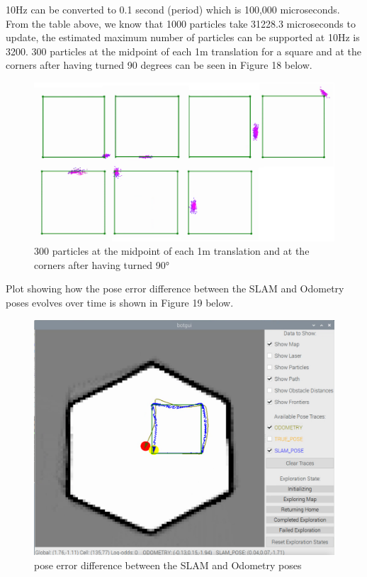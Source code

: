 \documentclass[journal]{IEEEtran}
\begin{document}
10Hz can be converted to 0.1 second (period) which is 100,000 microseconds. From the table above, we know that 1000 particles take 31228.3 microseconds to update, the estimated maximum number of particles can be supported at 10Hz is 3200. 300 particles at the midpoint of each 1m translation for a square and at the corners after having turned 90 degrees can be seen in Figure 18 below.\\
\begin{figure}[h]
\begin{center}
\includegraphics[width=1\linewidth]{image_2/figure_2_2_2.jpg}
\end{center}
   \caption{300 particles at the midpoint of each 1m translation and at the corners after having turned 90°}
   \label{figure_2_2_2}
\end{figure}

Plot showing how the pose error difference between the SLAM and Odometry poses evolves over time is shown in Figure 19 below.

\begin{figure}[h]
\begin{center}
\includegraphics[width=1\linewidth]{image_2/figure_2_2_2_4.jpg}
\end{center}
   \caption{pose error difference between the SLAM and Odometry poses}
   \label{figure_2_2_2_4}
\end{figure}
\end{document}
